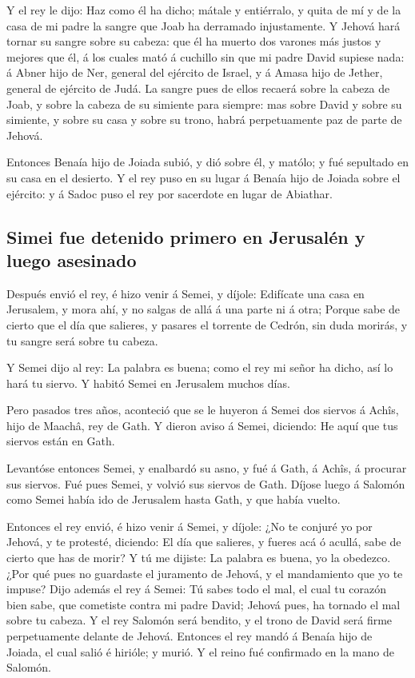  Y el rey le dijo: Haz como él ha dicho; mátale y
entiérralo, y quita de mí y de la casa de mi padre la sangre que Joab ha
derramado injustamente.  Y Jehová hará tornar su sangre
sobre su cabeza: que él ha muerto dos varones más justos y mejores que
él, á los cuales mató á cuchillo sin que mi padre David supiese nada: á
Abner hijo de Ner, general del ejército de Israel, y á Amasa hijo de
Jether, general de ejército de Judá.  La sangre pues de
ellos recaerá sobre la cabeza de Joab, y sobre la cabeza de su simiente
para siempre: mas sobre David y sobre su simiente, y sobre su casa y
sobre su trono, habrá perpetuamente paz de parte de Jehová.

 Entonces Benaía hijo de Joiada subió, y dió sobre él, y
matólo; y fué sepultado en su casa en el desierto.  Y el
rey puso en su lugar á Benaía hijo de Joiada sobre el ejército: y á
Sadoc puso el rey por sacerdote en lugar de Abiathar.

\hypertarget{simei-fue-detenido-primero-en-jerusaluxe9n-y-luego-asesinado}{%
\subsection{Simei fue detenido primero en Jerusalén y luego
asesinado}\label{simei-fue-detenido-primero-en-jerusaluxe9n-y-luego-asesinado}}

 Después envió el rey, é hizo venir á Semei, y díjole:
Edifícate una casa en Jerusalem, y mora ahí, y no salgas de allá á una
parte ni á otra;  Porque sabe de cierto que el día que
salieres, y pasares el torrente de Cedrón, sin duda morirás, y tu sangre
será sobre tu cabeza.

 Y Semei dijo al rey: La palabra es buena; como el rey mi
señor ha dicho, así lo hará tu siervo. Y habitó Semei en Jerusalem
muchos días.

 Pero pasados tres años, aconteció que se le huyeron á
Semei dos siervos á Achîs, hijo de Maachâ, rey de Gath. Y dieron aviso á
Semei, diciendo: He aquí que tus siervos están en Gath.

 Levantóse entonces Semei, y enalbardó su asno, y fué á
Gath, á Achîs, á procurar sus siervos. Fué pues Semei, y volvió sus
siervos de Gath.  Díjose luego á Salomón como Semei había
ido de Jerusalem hasta Gath, y que había vuelto.

 Entonces el rey envió, é hizo venir á Semei, y díjole:
¿No te conjuré yo por Jehová, y te protesté, diciendo: El día que
salieres, y fueres acá ó acullá, sabe de cierto que has de morir? Y tú
me dijiste: La palabra es buena, yo la obedezco.  ¿Por
qué pues no guardaste el juramento de Jehová, y el mandamiento que yo te
impuse?  Dijo además el rey á Semei: Tú sabes todo el
mal, el cual tu corazón bien sabe, que cometiste contra mi padre David;
Jehová pues, ha tornado el mal sobre tu cabeza.  Y el rey
Salomón será bendito, y el trono de David será firme perpetuamente
delante de Jehová.  Entonces el rey mandó á Benaía hijo
de Joiada, el cual salió é hirióle; y murió. Y el reino fué confirmado
en la mano de Salomón.

